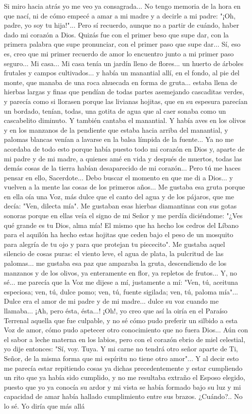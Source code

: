 \documentclass[12pt]{book} %
\begin{document}
Si miro hacia atrás yo me veo ya consagrada... No tengo memoria de la hora en que nací, ni de cómo empecé a amar a mi madre y a decirle a mi padre: "¡Oh, padre, yo soy tu hija!"... Pero sí recuerdo, aunque no a partir de cuándo, haber dado mi corazón a Dios. Quizás fue con el primer beso que supe dar, con la primera palabra que supe pronunciar, con el primer paso que supe dar... Sí, eso es, creo que mi primer recuerdo de amor lo encuentro junto a mi primer paso seguro... Mi casa... Mi casa tenía un jardín lleno de flores... un huerto de árboles frutales y campos cultivados... y había un manantial allí, en el fondo, al pie del monte, que manaba de una roca ahuecada en forma de gruta... estaba llena de hierbas largas y finas que pendían de todas partes asemejando cascaditas verdes, y parecía como si llorasen porque las livianas hojitas, que en su espesura parecían un bordado, tenían, todas, una gotita de agua que al caer sonaba como un cascabelito diminuto. Y también cantaba el manantial. Y había aves en los olivos y en los manzanos de la pendiente que estaba hacia arriba del manantial, y palomas blancas venían a lavarse en la balsa límpida de la fuente... Ya no me acordaba de todo esto porque había puesto todo mi corazón en Dios y, aparte de mi padre y de mi madre, a quienes amé en vida y después de muertos, todas las demás cosas de la tierra habían desaparecido de mi corazón... Pero tú me haces pensar en ello, Sacerdote... Debo buscar el momento en que me di a Dios... y vuelven a la mente las cosas de los primeros años... Me gustaba esa gruta porque en ella oía una Voz, más dulce que el canto del agua y de los pájaros, que me decía: "Ven, dilecta mía". Me gustaban esas hierbas diamantinas con sus gotas sonoras porque en ellas veía el signo de mi Señor y me perdía diciéndome: "¿Ves qué grande es tu Dios, alma mía! El mismo que ha hecho los cedros del Líbano para el aquilón ha hecho estas hojitas que ceden bajo el peso de un mosquito para alegría de tu ojo y para que protejan tu piececito". Me gustaba aquel silencio de cosas puras: el viento leve, el agua de plata, la pulcritud de las palomas... me gustaba esa paz que amparaba la gruta, descendiendo de los manzanos y de los olivos, ya enteramente en flor, ya repletos de frutos... Y, no sé... me parecía que la Voz me dijese a mí, justamente a mí: "Ven, tú, aceituna especiosa; ven, tú, dulce pomo; ven, tú, fuente sigilada; ven, tú, paloma mía"... Dulce era el amor de mi padre y de mi madre... dulce su voz cuando me llamaba... ¡Ah, pero ésta, ésta...! ¡Oh!, yo creo que así la oiría en el Paraíso Terrenal aquella que fue culpable, y no sé cómo pudo preferir un silbido a esta Voz de amor, cómo pudo apetecer otro conocimiento que no fuera Dios... Aún con el sabor a leche materna en los labios, pero con el corazón ebrio de miel celestial, yo dije entonces: "Sí, voy. Tuya. Y mi carne no tendrá otro señor aparte de Ti, Señor, de la misma forma que mi espíritu no tiene otro amor"... Y al decir esto me parecía estar repitiendo cosas ya dichas precedentemente y estar cumpliendo un rito que ya había sido cumplido, y no me resultaba extraño el Esposo elegido, puesto que yo ya conocía su ardor y mi vista se había formado bajo su luz y mi capacidad de amar había hallado cumplimiento entre sus brazos. ¿Cuándo?.. No lo sé. Yo diría que más allá 
\end{document}
